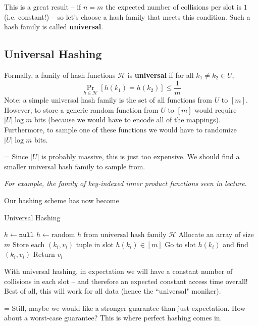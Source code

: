\documentclass[11pt]{article}
\begin{document}
This is a great result -- if $n = m$ the expected number of collisions per slot is $1$ (i.e. constant!) -- so let's choose a hash family that meets this condition. Such a hash family is called \textbf{universal}.

\subsection*{Universal Hashing}

Formally, a family of hash functions $\mathcal{H}$ is \textbf{universal} if for all $k_1 \neq k_2 \in U$,
$$\Pr_{h \in \mathcal{H}}[h(k_1) = h(k_2)] \leq \frac{1}{m}$$
Note: a simple universal hash family is the set of all functions from $U$ to $[m]$. However, to store a generic random function from $U$ to $[m]$ would require $|U| \log m$ bits (because we would have to encode all of the mappings). Furthermore, to sample one of these functions we would have to randomize $|U| \log m$ bits.

{\parskip=\baselineskip
Since $|U|$ is probably massive, this is just too expensive. We should find a smaller universal hash family to sample from.
}

\begin{flushright}
\textit{For example, the family of key-indexed inner product functions seen in lecture.}
\end{flushright}

Our hashing scheme has now become

\begin{algorithm}
\caption{Universal Hashing}
\begin{algorithmic}[1]
\State $h \gets \texttt{null}$
\State $h \gets \text{random $h$ from universal hash family $\mathcal{H}$}$
\State Allocate an array of size $m$
\State Store each $(k_i, v_i)$ tuple in slot $h(k_i) \in [m]$
\EndProcedure
{}
\State Go to slot $h(k_i)$ and find $(k_i, v_i)$
\State Return $v_i$
\EndProcedure
\end{algorithmic}
\end{algorithm}

With universal hashing, in expectation we will have a constant number of collisions in each slot -- and therefore an expected constant access time overall! Best of all, this will work for all data (hence the ``universal" moniker).

{\parskip=\baselineskip
Still, maybe we would like a stronger guarantee than just expectation. How about a worst-case guarantee? This is where perfect hashing comes in.
}
\end{document}
